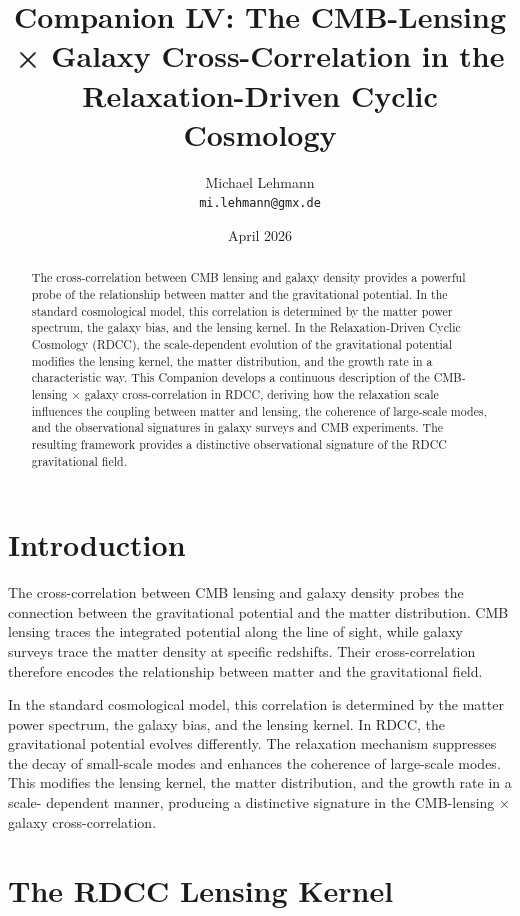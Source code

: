 \documentclass[11pt,a4paper]{article}
\title{\textbf{Companion LV: The CMB-Lensing × Galaxy Cross-Correlation in the Relaxation-Driven Cyclic Cosmology}}
\author{Michael Lehmann \\ \texttt{mi.lehmann@gmx.de}}
\date{April 2026}
\begin{document}
\maketitle

\begin{abstract}
The cross-correlation between CMB lensing and galaxy density provides a powerful 
probe of the relationship between matter and the gravitational potential. In the 
standard cosmological model, this correlation is determined by the matter power 
spectrum, the galaxy bias, and the lensing kernel. In the Relaxation-Driven Cyclic 
Cosmology (RDCC), the scale-dependent evolution of the gravitational potential 
modifies the lensing kernel, the matter distribution, and the growth rate in a 
characteristic way. This Companion develops a continuous description of the 
CMB-lensing × galaxy cross-correlation in RDCC, deriving how the relaxation scale 
influences the coupling between matter and lensing, the coherence of large-scale 
modes, and the observational signatures in galaxy surveys and CMB experiments. The 
resulting framework provides a distinctive observational signature of the RDCC 
gravitational field.
\end{abstract}
\section{Introduction}

The cross-correlation between CMB lensing and galaxy density probes the connection 
between the gravitational potential and the matter distribution. CMB lensing traces 
the integrated potential along the line of sight, while galaxy surveys trace the 
matter density at specific redshifts. Their cross-correlation therefore encodes the 
relationship between matter and the gravitational field.

In the standard cosmological model, this correlation is determined by the matter 
power spectrum, the galaxy bias, and the lensing kernel. In RDCC, the gravitational 
potential evolves differently. The relaxation mechanism suppresses the decay of 
small-scale modes and enhances the coherence of large-scale modes. This modifies 
the lensing kernel, the matter distribution, and the growth rate in a scale-
dependent manner, producing a distinctive signature in the CMB-lensing × galaxy 
cross-correlation.
\section{The RDCC Lensing Kernel}
\end{document}
